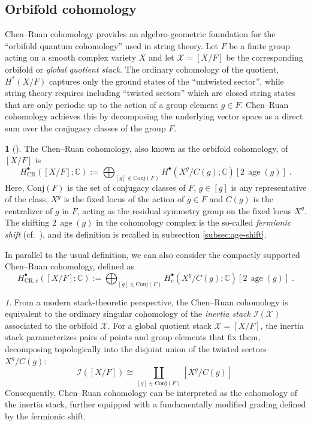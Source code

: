 \documentclass[11pt,english]{amsart}
\numberwithin{equation}{section}
\numberwithin{figure}{section}
\theoremstyle{plain}
\theoremstyle{plain}
\theoremstyle{definition}
\newtheorem{defn}[thm]{\protect\definitionname}
\theoremstyle{remark}
\newtheorem{rem}[thm]{\protect\remarkname}
\newcommand{\age}{\operatorname{age}}
\providecommand{\remarkname}{Remark}
\providecommand{\definitionname}{Definition}
\begin{document}
\subsection{Orbifold cohomology}

Chen--Ruan cohomology \cite{CR} provides an algebro-geometric foundation for the ``orbifold quantum cohomology'' used in string theory. Let $F$ be a finite group acting on a smooth complex variety $X$ and let $\mathcal{X} = [X/F]$ be the corresponding orbifold or \emph{global quotient stack}. The ordinary cohomology of the quotient, $H^*(X/F)$ captures only the ground states of the ``untwisted sector'', while string theory requires including ``twisted sectors'' which are closed string states that are only periodic up to the action of a group element $g \in F$. Chen--Ruan cohomology achieves this by decomposing the underlying vector space as a direct sum over the conjugacy classes of the group $F$.

\begin{defn}[{\cite[Definition 3.1.2]{CR}}]\label{def:CR-cohomology}
The Chen--Ruan cohomology, also known as the orbifold cohomology, of $[X/F]$ is
\begin{equation}\label{eq:CR}
H^\bullet_{\text{CR}}([X/F]; \mathbb{C}) := \bigoplus_{[g] \in \text{Conj}(F)} H^{\bullet}(X^g / C(g); \mathbb{C})[2 \, \age(g)]\; .
\end{equation}
Here, $\text{Conj}(F)$ is the set of conjugacy classes of $F$, $g \in [g]$ is any representative of the class, $X^g$ is the fixed locus of the action of $g\in F$ and $C(g)$ is the centralizer of $g$ in $F$, acting as the residual symmetry group on the fixed locus $X^g$. The shifting  $2\,\age(g)$ in the cohomology complex is the so-called \emph{fermionic shift} (cf.\ \cite[Definition 3.1.1]{CR}), and its definition is recalled in subsection \ref{subsec:age-shift}.
\end{defn}

In parallel to the usual definition, we can also consider the compactly supported Chen--Ruan cohomology, defined as
\begin{equation*}
H^\bullet_{\text{CR},c}([X/F]; \mathbb{C}) := \bigoplus_{[g] \in \text{Conj}(F)} H^{\bullet}_c(X^g / C(g); \mathbb{C})[2 \, \age(g)]\; .
\end{equation*}

\begin{rem}
    From a modern stack-theoretic perspective, the Chen--Ruan cohomology is equivalent to the ordinary singular cohomology of the \emph{inertia stack $\mathcal{I}(\mathcal{X})$} associated to the orbifold $\mathcal{X}$. For a global quotient stack $\mathcal{X} = [X/F]$, the inertia stack parameterizes pairs of points and group elements that fix them, decomposing topologically into the disjoint union of the twisted sectors $X^g / C(g)$:
    \begin{equation}
    \mathcal{I}([X/F]) \cong \coprod_{[g] \in \text{Conj}(F)} [X^g / C(g)]\; 
    \end{equation}
    Consequently, Chen--Ruan cohomology can be interpreted as the cohomology of the inertia stack, further equipped with a fundamentally modified grading defined by the fermionic shift.
\end{rem}
\end{document}
